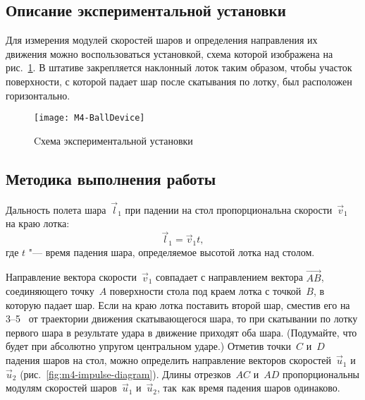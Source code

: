 \documentclass[a4paper, 12pt]{extarticle}
\begin{document}
\subsection{Описание экспериментальной установки}
Для измерения модулей скоростей шаров и определения направления их движения можно воспользоваться установкой, схема которой изображена на рис.~\ref{fig:m4-equipment}. В штативе закрепляется наклонный лоток таким образом, чтобы участок поверхности, с которой падает шар после скатывания по лотку, был расположен горизонтально. %

\begin{figure}[h]
\begin{center}
\texttt{[image: M4-BallDevice]}
\end{center}
\caption{Cхема экспериментальной установки \label{fig:m4-equipment}}
\end{figure}

\subsection{Методика выполнения работы}


Дальность полета шара~$\vec l_1$ при падении на стол пропорциональна скорости~$\vec v_1$ на краю лотка:
\[
\vec l_1 = \vec v_1 t,
\]
где $t$ "--- время падения шара, определяемое высотой лотка над столом.

Направление вектора скорости~$\vec v_1$ совпадает с направлением вектора $\vec{AB}$, соединяющего точку~$A$ поверхности стола под краем лотка с точкой~$B$, в которую падает шар. Если на краю лотка поставить второй шар, сместив его на 3--5~ от траектории движения скатывающегося шара, то при скатывании по лотку первого шара в результате удара в движение приходят оба шара. (Подумайте, что будет при абсолютно упругом центральном ударе.) Отметив точки~$C$ и~$D$ падения шаров на стол, можно определить направление векторов скоростей~$\vec u_1$ и~$\vec u_2$ (рис.~\ref{fig:m4-impulse-diagram}). Длины отрезков~$AC$ и~$AD$ пропорциональны модулям скоростей шаров~$\vec u_1$ и~$\vec u_2$, так~как время падения шаров одинаково. %
\end{document}
